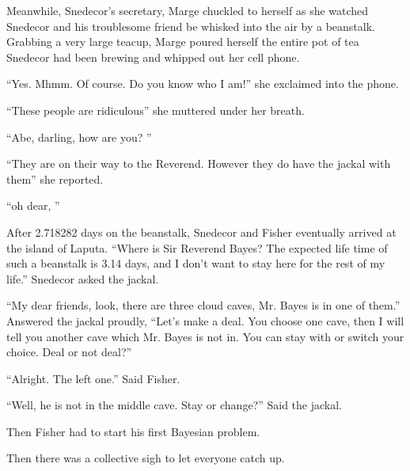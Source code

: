 \documentclass{article}
\begin{document}

Meanwhile, Snedecor's secretary, Marge chuckled to herself as she watched Snedecor and his troublesome friend be whisked into the air by a beanstalk. Grabbing a very large teacup, Marge poured herself the entire pot of tea Snedecor had been brewing and whipped out her cell phone. 

``Yes. Mhmm. Of course. Do you know who I am!'' she exclaimed into the phone. 

``These people are ridiculous'' she muttered under her breath. 

``Abe, darling, how are you? ''

``They are on their way to the Reverend. However they do have the jackal with them'' she reported.

``oh dear, ''



After 2.718282 days on the beanstalk, Snedecor and Fisher eventually arrived at the island of Laputa. 
``Where is Sir Reverend Bayes? The expected life time of such a beanstalk is 3.14 days, 
and I don't want to stay here for the rest of my life.'' Snedecor asked the jackal.

``My dear friends, look, there are three cloud caves, Mr. Bayes is in one of them.'' Answered the jackal proudly,
``Let's make a deal. You choose one cave, then I will tell you another cave which Mr. Bayes is not in.
You can stay with or switch your choice. Deal or not deal?''

``Alright. The left one.'' Said Fisher.

``Well, he is not in the middle cave. Stay or change?'' Said the jackal.

Then Fisher had to start his first Bayesian problem.




Then there was a collective sigh to let everyone catch up.

\end{document}

